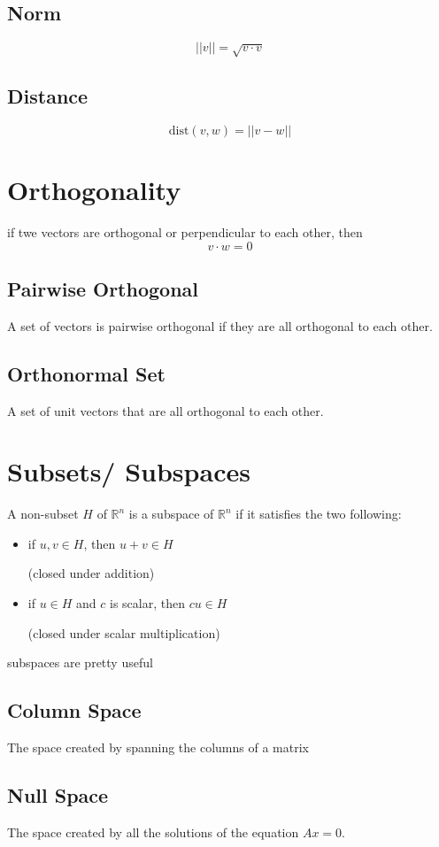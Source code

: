 \documentclass[fleqn]{report}
\begin{document}
\subsection{Norm}
\[
||v|| = \sqrt{v \cdot v}
\]

\subsection{Distance}
\[
\textrm{dist}(v, w) = ||v - w|| 
\]

\section{Orthogonality}
if twe vectors are orthogonal or perpendicular to each other, then 
\[
v \cdot w = 0
\]

\subsection{Pairwise Orthogonal}
A set of vectors is pairwise orthogonal if they are 
all orthogonal to each other. 

\subsection{Orthonormal Set}
A set of unit vectors that are all orthogonal to each other. 

\section{Subsets/ Subspaces}
A non-subset $H$ of $\mathbb{R}^n$ is a subspace of $\mathbb R^n$
if it satisfies the two following:
\begin{itemize}
    \item 
    if $u, v \in H$, then $u + v \in H$ 

    (closed under addition)
    \item 
    if $u \in H$ and $c$ is scalar, then $cu \in H$

    (closed under scalar multiplication)
\end{itemize}

subspaces are pretty useful

\subsection{Column Space}
The space created by spanning the columns of a matrix

\subsection{Null Space}
The space created by all the solutions of the equation $Ax = 0$. 
\end{document}
